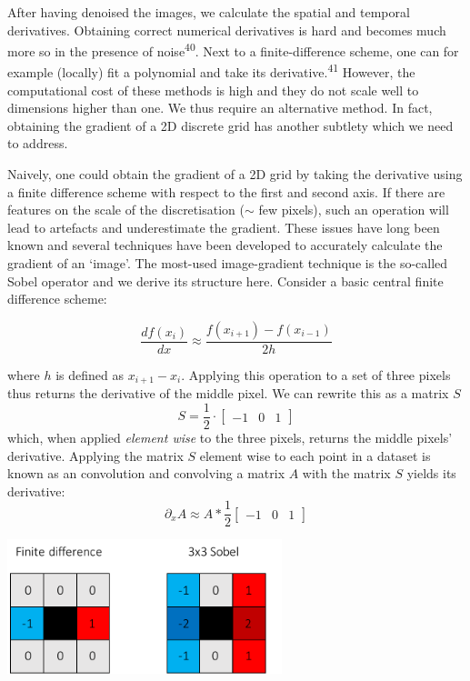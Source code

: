 \documentclass{Dissertate}
\let\origfigure\figure
\let\endorigfigure\endfigure
\renewenvironment{figure}[1][2] {
    \expandafter\origfigure\expandafter[H]
} {
    \endorigfigure
}
\begin{document}
After having denoised the images, we calculate the spatial and temporal
derivatives. Obtaining correct numerical derivatives is hard and becomes
much more so in the presence of noise\textsuperscript{40}. Next to a
finite-difference scheme, one can for example (locally) fit a polynomial
and take its derivative.\textsuperscript{41} However, the computational cost of these methods is high and they do not scale well to dimensions
higher than one. We thus require an alternative method. In fact, obtaining the gradient of a 2D discrete grid has another subtlety which we need to address.

Naively, one could obtain the gradient of a 2D grid by taking the
derivative using a finite difference scheme with respect to the first
and second axis. If there are features on the scale of the
discretisation (\(\sim\) few pixels), such an operation will lead to
artefacts and underestimate the gradient. These issues have long been
known and several techniques have been developed to accurately calculate
the gradient of an `image'. The most-used image-gradient technique is
the so-called Sobel operator and we derive its structure here. Consider a basic central finite difference scheme:

\[
\frac{df(x_i)}{dx}\approx\frac{f(x_{i+1})-f(x_{i-1})}{2h}
\]

where \(h\) is defined as \(x_{i+1}-x_{i}\). Applying this operation to a set of three pixels thus returns the derivative of the middle pixel. We can rewrite this as a matrix $S$
 \[
S=\frac{1}{2}\cdot
\begin{bmatrix}
-1 & 0 & 1
\end{bmatrix}
\] 
which, when applied \emph{element wise} to the three pixels, returns the middle pixels' derivative. Applying the matrix $S$ element wise to each point in a dataset is known as an convolution and convolving a matrix $A$ with the matrix $S$ yields its derivative:
 \[
\partial_xA\approx A*\frac{1}{2}\begin{bmatrix}
-1 & 0 & 1
\end{bmatrix}
\] 
\begin{figure}
	\centering
	\includegraphics[width=0.6\textwidth]{source/figures/pdf/derivative.pdf}
	\caption{In the left panel we show how a finite difference operator would be applied to the black pixel. The right panel shows this for the Sobel operator.}
	\label{fig:Sobel}
\end{figure}
\end{document}

